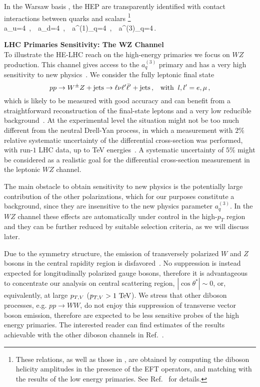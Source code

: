 \documentclass[../report.tex]{subfiles}
\begin{document}
In the Warsaw basis \cite{Grzadkowski:2010es}, the HEP are transparently identified with contact interactions between quarks and scalars \footnote{These relations, as well as those in  , are obtained by computing the diboson helicity amplitudes in the presence of the EFT operators, and matching with the results of the low energy primaries. See Ref.~\cite{Franceschini:2017ab} for details.}
\be
a_u=4\ ,\  \ a_d=4\ ,\ \  a^{(1)}_q=4\ ,\ \  a^{(3)}_q=4\,.
\ee


\vspace{1cm}
\noindent
{\bf LHC Primaries Sensitivity: The $\mathbf{WZ}$ Channel}\\
To illustrate the HE-LHC reach on the high-energy primaries we focus on $WZ$ production. This channel gives access to the
$a_q^{(3)}$ primary and has a very high sensitivity to new physics~\cite{Franceschini:2017ab}. We consider the fully leptonic final state
$$
pp\to W^{\pm}Z + {\rm{jets}}\to \ell\nu\ell^{\prime}\bar{\ell}^{\prime} + {\rm{jets}} \,, \;\;\; {\rm{with}}\;\;l,l'=e,\mu\,,
$$ 
which is likely to be measured with good accuracy and can benefit from a straightforward reconstruction of the final-state
leptons and a very low reducible background~\cite{Aad:2016ett}. At the experimental level
the situation might not be too much different from the neutral Drell-Yan process, in which a measurement with $2\%$
relative systematic uncertainty of the differential cross-section was performed, with run-$1$ LHC data,
up to TeV energies~\cite{Aad:2016zzw}.
A systematic uncertainty of $5\%$ might be considered as a realistic goal for the differential cross-section measurement in the leptonic $WZ$ channel. 

The main obstacle to obtain sensitivity to new physics is the potentially large contribution of the other polarizations, which for our purposes constitute a background, since they are insensitive to the new physics parameter $a_{q}^{(3)}$. In the $WZ$ channel these effects are automatically under control in the high-$p_T$ region and they can be further reduced by suitable selection criteria, as we will discuss later.

Due to the symmetry structure, the emission of transversely polarized $W$ and $Z$ bosons in the central rapidity region is disfavored~\cite{Franceschini:2017ab}. No suppression is instead expected for longitudinally polarized gauge bosons, therefore it is advantageous to concentrate our analysis on central scattering region, $|\cos \theta^*| \sim 0$, or, equivalently, at large $p_{T,V}$ ($p_{T,V} > 1\ {\rm TeV}$). We stress that other diboson processes, e.g. $pp \to WW$, do not enjoy this suppression of transverse vector boson emission, therefore are expected to be less sensitive probes of the high energy primaries. The interested reader can find estimates of the results achievable with the other diboson channels in Ref.~\cite{Franceschini:2017ab}.
\end{document}
